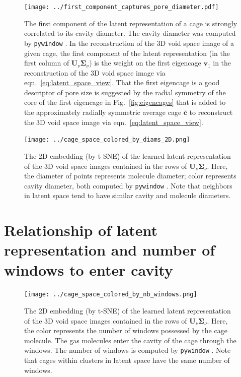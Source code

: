 \documentclass[journal=jacsat,manuscript=article]{achemso}
\begin{document}
\begin{figure}
\centering
	\texttt{[image: ../first\_component\_captures\_pore\_diameter.pdf]}
	\caption{The first component of the latent representation of a cage is strongly correlated to its cavity diameter. The cavity diameter was computed by \texttt{pywindow} \cite{miklitz2018pywindow}. In the reconstruction of the 3D void space image of a given cage, the first component of the latent representation (in the first column of $\mathbf{U}_\nu \mathbf{\Sigma}_\nu$) is the weight on the first eigencage $\mathbf{v}_1$ in the reconstruction of the 3D void space image via eqn.~\ref{eq:latent_space_view}. That the first eigencage is a good descriptor of pore size is suggested by the radial symmetry of the core of the first eigencage in Fig.~\ref{fig:eigencages} that is added to the approximately radially symmetric average cage $\bar{\mathbf{c}}$ to reconstruct the 3D void space image via eqn.~\ref{eq:latent_space_view}.
	} \label{fig:first_component_captures_pore_diameter}
\end{figure}


\begin{figure}
\centering
	\texttt{[image: ../cage\_space\_colored\_by\_diams\_2D.png]}
	\caption{The 2D embedding (by t-SNE) of the learned latent representation of the 3D void space images contained in the rows of $\mathbf{U}_\nu \mathbf{\Sigma}_\nu$. Here, the diameter of points represents molecule diameter; color represents cavity diameter, both computed by \texttt{pywindow} \cite{miklitz2018pywindow}. Note that neighbors in latent space tend to have similar cavity and molecule diameters.
	} \label{fig:cage_space_colored_by_diams_2D}
\end{figure}

\newpage
\clearpage

\section{Relationship of latent representation and number of windows to enter cavity}

\begin{figure}
\centering
	\texttt{[image: ../cage\_space\_colored\_by\_nb\_windows.png]}
	\caption{The 2D embedding (by t-SNE) of the learned latent representation of the 3D void space images contained in the rows of $\mathbf{U}_\nu \mathbf{\Sigma}_\nu$. Here, the color represents the number of windows possessed by the cage molecule. The gas molecules enter the cavity of the cage through the windows. The number of windows is computed by \texttt{pywindow} \cite{miklitz2018pywindow}. Note that cages within clusters in latent space have the same number of windows.
	} \label{fig:cage_space_colored_by_nb_windows}
\end{figure}
\end{document}

